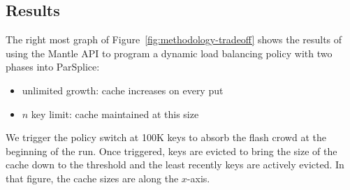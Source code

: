 %
%

\subsection*{Results}

The right most graph of Figure~\ref{fig:methodology-tradeoff} shows the results
of using the Mantle API to program a dynamic load balancing policy with two
phases into ParSplice:

\begin{itemize}
  \item unlimited growth: cache increases on every put
  \item \(n\) key limit: cache maintained at this size
\end{itemize}

We trigger the policy switch at 100K keys to absorb the flash crowd at the
beginning of the run. Once triggered, keys are evicted to bring the size of the
cache down to the threshold and the least recently keys are actively evicted.
In that figure, the cache sizes are along the \(x\)-axis.

